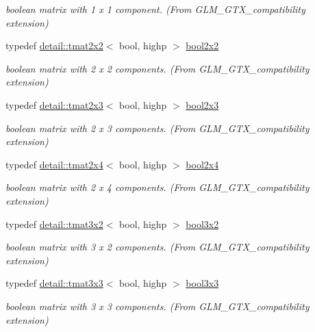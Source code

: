 \begin{DoxyCompactItemize}
\begin{DoxyCompactList}\small\item\em boolean matrix with 1 x 1 component. (From G\+L\+M\+\_\+\+G\+T\+X\+\_\+compatibility extension) \end{DoxyCompactList}\item 
typedef \hyperlink{structglm_1_1detail_1_1tmat2x2}{detail\+::tmat2x2}$<$ bool, highp $>$ \hyperlink{group__gtx__compatibility_ga44cd09c0dad9ea163f038a342555867f}{bool2x2}
\begin{DoxyCompactList}\small\item\em boolean matrix with 2 x 2 components. (From G\+L\+M\+\_\+\+G\+T\+X\+\_\+compatibility extension) \end{DoxyCompactList}\item 
typedef \hyperlink{structglm_1_1detail_1_1tmat2x3}{detail\+::tmat2x3}$<$ bool, highp $>$ \hyperlink{group__gtx__compatibility_ga75013772bb088d107a1c1a994e7f9b14}{bool2x3}
\begin{DoxyCompactList}\small\item\em boolean matrix with 2 x 3 components. (From G\+L\+M\+\_\+\+G\+T\+X\+\_\+compatibility extension) \end{DoxyCompactList}\item 
typedef \hyperlink{structglm_1_1detail_1_1tmat2x4}{detail\+::tmat2x4}$<$ bool, highp $>$ \hyperlink{group__gtx__compatibility_gaf24096d8a88d274b94002386a3fcab0c}{bool2x4}
\begin{DoxyCompactList}\small\item\em boolean matrix with 2 x 4 components. (From G\+L\+M\+\_\+\+G\+T\+X\+\_\+compatibility extension) \end{DoxyCompactList}\item 
typedef \hyperlink{structglm_1_1detail_1_1tmat3x2}{detail\+::tmat3x2}$<$ bool, highp $>$ \hyperlink{group__gtx__compatibility_gacf961fda4c64459911f552cbffdbffa8}{bool3x2}
\begin{DoxyCompactList}\small\item\em boolean matrix with 3 x 2 components. (From G\+L\+M\+\_\+\+G\+T\+X\+\_\+compatibility extension) \end{DoxyCompactList}\item 
typedef \hyperlink{structglm_1_1detail_1_1tmat3x3}{detail\+::tmat3x3}$<$ bool, highp $>$ \hyperlink{group__gtx__compatibility_gae9cc5d3d9c72543e303af4d702bf7b40}{bool3x3}
\begin{DoxyCompactList}\small\item\em boolean matrix with 3 x 3 components. (From G\+L\+M\+\_\+\+G\+T\+X\+\_\+compatibility extension) \end{DoxyCompactList}\item 

\end{DoxyCompactItemize}
